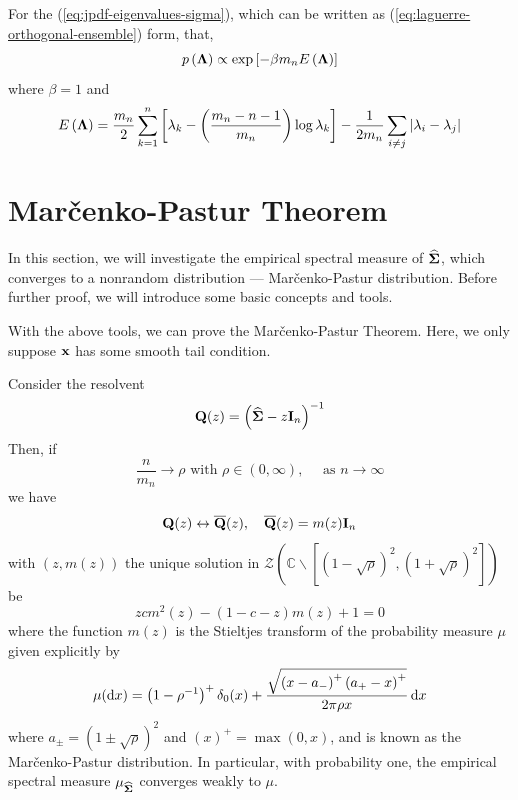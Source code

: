 \begin{remark}
	For the (\ref{eq:jpdf-eigenvalues-sigma}), which can be written as (\ref{eq:laguerre-orthogonal-ensemble}) form, that,
	\begin{equation*}
		p\left(\boldsymbol{\Lambda}\right)\propto\exp\left[-\beta m_{n}E\left(\boldsymbol{\Lambda}\right)\right]
	\end{equation*}
	where $\beta=1$ and
	\begin{equation*}
		E\left(\boldsymbol{\Lambda}\right)=\frac{m_{n}}{2}\sum_{k=1}^{n}\left[\lambda_{k}-\left(\frac{m_{n}-n-1}{m_{n}}\right)\log\lambda_{k}\right]-\frac{1}{2m_{n}}\sum_{i\neq j}\left|\lambda_{i}-\lambda_{j}\right|
	\end{equation*}
\end{remark}

\section{Mar\v{c}enko-Pastur Theorem}

In this section, we will investigate the empirical spectral measure of $\widehat{\boldsymbol{\Sigma}}$, which converges to a nonrandom distribution --- Mar\v{c}enko-Pastur distribution. Before further proof, we will introduce some basic concepts and tools.

With the above tools, we can prove the Mar\v{c}enko-Pastur Theorem. Here, we only suppose ${\bf x}$ has some smooth tail condition.
\begin{theorem} \label{thm:marcenko-pastur-theorem}
	Consider the resolvent
	\begin{equation*}
		{\bf Q}(z)=\left(\widehat{\boldsymbol{\Sigma}}-z\mathbf{I}_{n}\right)^{-1}
	\end{equation*}
	Then, if
	\begin{equation*}
		\frac{n}{m_{n}}\rightarrow\rho\text{ with }\rho\in(0,\infty),\quad\text{ as }n\rightarrow\infty
	\end{equation*}
	we have
	\begin{equation*}
		{\bf Q}(z)\leftrightarrow\overline{{\bf Q}}(z),\quad\overline{{\bf Q}}(z)=m(z)\mathbf{I}_{n}
	\end{equation*}
	with $(z,m(z))$ the unique solution in $\mathcal{Z}\left(\mathbb{C}\backslash\left[(1-\sqrt{\rho})^{2},(1+\sqrt{\rho})^{2}\right]\right)$ be
	\begin{equation*}
		zcm^{2}(z)-(1-c-z)m(z)+1=0
	\end{equation*}
	where the function $m(z)$ is the Stieltjes transform of the probability measure $\mu$ given explicitly by
	\begin{equation*}
		\mu(\mathop{}\!\mathrm{d} x)=\left(1-\rho^{-1}\right)^{+}\delta_{0}(x)+\frac{\sqrt{\left(x-a_{-}\right)^{+}\left(a_{+}-x\right)^{+}}}{2\pi\rho x}\mathop{}\!\mathrm{d} x
	\end{equation*}
	where $a_{\pm}=(1 \pm \sqrt{\rho})^{2}$ and $(x)^{+}=\max (0, x)$, and is known as the Mar\v{c}enko-Pastur distribution. In particular, with probability one, the empirical spectral measure $\mu_{\widehat{\boldsymbol{\Sigma}}}$ converges weakly to $\mu $.
\end{theorem}

